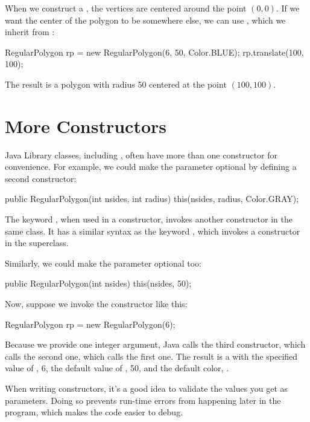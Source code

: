 When we construct a , the vertices are centered around the point $(0, 0)$.
If we want the center of the polygon to be somewhere else, we can use , which we inherit from :

\begin{code}
RegularPolygon rp = new RegularPolygon(6, 50, Color.BLUE);
rp.translate(100, 100);
\end{code}

The result is a polygon with radius 50 centered at the point $(100, 100)$.


\section{More Constructors}

Java Library classes, including , often have more than one constructor for convenience.
For example, we could make the  parameter optional by defining a second constructor:

\begin{code}
public RegularPolygon(int nsides, int radius) {
    this(nsides, radius, Color.GRAY);
}
\end{code}

The keyword , when used in a constructor, invokes another constructor in the same class.
It has a similar syntax as the keyword , which invokes a constructor in the superclass.

Similarly, we could make the  parameter optional too:

\begin{code}
public RegularPolygon(int nsides) {
    this(nsides, 50);
}
\end{code}

Now, suppose we invoke the  constructor like this:

\begin{code}
RegularPolygon rp = new RegularPolygon(6);
\end{code}

Because we provide one integer argument, Java calls the third constructor, which calls the second one, which calls the first one.
The result is a  with the specified value of , 6, the default value of , 50, and the default color, .

When writing constructors, it's a good idea to validate the values you get as parameters.
Doing so prevents run-time errors from happening later in the program, which makes the code easier to debug.

